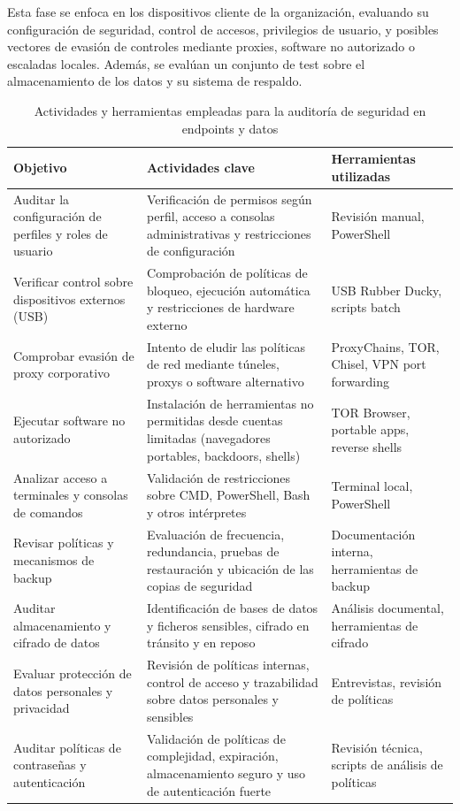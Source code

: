 \documentclass[a4paper, 11pt]{article}
\begin{document}
Esta fase se enfoca en los dispositivos cliente de la organización, evaluando su configuración de seguridad, control de accesos, privilegios de usuario, y posibles vectores de evasión de controles mediante proxies, software no autorizado o escaladas locales.
Además, se evalúan un conjunto de test sobre el almacenamiento de los datos y su sistema de respaldo.

\begin{table}[H]
\centering
\renewcommand{\arraystretch}{1.4}
\begin{tabular}{|p{4.3cm}|p{7.2cm}|p{3.6cm}|}
\hline
\textbf{Objetivo} & \textbf{Actividades clave} & \textbf{Herramientas utilizadas} \\
\hline
Auditar la configuración de perfiles y roles de usuario & Verificación de permisos según perfil, acceso a consolas administrativas y restricciones de configuración & Revisión manual, PowerShell \\
\hline
Verificar control sobre dispositivos externos (USB) & Comprobación de políticas de bloqueo, ejecución automática y restricciones de hardware externo & USB Rubber Ducky, scripts batch \\
\hline
Comprobar evasión de proxy corporativo & Intento de eludir las políticas de red mediante túneles, proxys o software alternativo & ProxyChains, TOR, Chisel, VPN port forwarding \\
\hline
Ejecutar software no autorizado & Instalación de herramientas no permitidas desde cuentas limitadas (navegadores portables, backdoors, shells) & TOR Browser, portable apps, reverse shells \\
\hline
Analizar acceso a terminales y consolas de comandos & Validación de restricciones sobre CMD, PowerShell, Bash y otros intérpretes & Terminal local, PowerShell \\
\hline
Revisar políticas y mecanismos de backup & Evaluación de frecuencia, redundancia, pruebas de restauración y ubicación de las copias de seguridad & Documentación interna, herramientas de backup \\
\hline
Auditar almacenamiento y cifrado de datos & Identificación de bases de datos y ficheros sensibles, cifrado en tránsito y en reposo & Análisis documental, herramientas de cifrado \\
\hline
Evaluar protección de datos personales y privacidad & Revisión de políticas internas, control de acceso y trazabilidad sobre datos personales y sensibles & Entrevistas, revisión de políticas \\
\hline
Auditar políticas de contraseñas y autenticación & Validación de políticas de complejidad, expiración, almacenamiento seguro y uso de autenticación fuerte & Revisión técnica, scripts de análisis de políticas \\
\hline
\end{tabular}
\caption{Actividades y herramientas empleadas para la auditoría de seguridad en endpoints y datos}
\label{tab:endpoints_datos}
\end{table}
\end{document}
